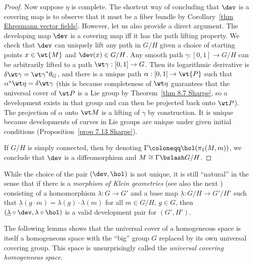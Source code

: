 \begin{proof}
    Now suppose $\eta$ is complete. The shortcut way of concluding that $\dev$ is a covering map is to observe that it must be a fiber bundle by Corollary~\ref{thm Ehresmann vector fields}. However, let us also provide a direct argument. The developing map $\dev$ is a covering map iff it has the path lifting property. We check that $\dev$ can uniquely lift any path in $G\slash H$ given a choice of starting points $x\in\wt{M}$ and $\dev(x)\in G\slash H$. Any smooth path $\gamma:[0,1]\to G\slash H$ can be arbitrarily lifted to a path $\wt\gamma:[0,1]\to G$. Then its logarithmic derivative is $\delta\wt\gamma={\wt\gamma}^\ast \theta_G$, and there is a unique path $\alpha:[0,1]\to \wt{P}$ such that $\alpha^\ast \wt\eta=\delta\wt\gamma$ (this is because completeness of $\wt\eta$ guarantees that the universal cover of $\wt P$ is a Lie group by Theorem~\ref{thm 8.7 Sharpe}, so a development exists in that group and can then be projected back onto $\wt P$). The projection of $\alpha$ onto $\wt M$ is a lifting of $\gamma$ by construction. It is unique because developments of curves in Lie groups are unique under given initial conditions (Proposition~\ref{prop 7.13 Sharpe}).

    If $G\slash H$ is simply connected, then by denoting $\Gamma\coloneqq \hol(\pi_1(M,m))$, we conclude that $\dev$ is a diffeomorphism and $M\cong \Gamma\bslash G\slash H$.
\end{proof}

\begin{xca}
    While the choice of the pair $(\dev,\hol)$ is not unique, it is still ``natural'' in the sense that if there is a \emph{morphism of Klein geometries} (see also the next \sect) consisting of a homomorphism $\lambda:G\to G'$ and a base map $\underline{\lambda}:G\slash H\to G'\slash H'$ such that $\underline{\lambda}(g\cdot m)=\lambda(g)\cdot \underline{\lambda}(m)$ for all $m\in G\slash H$, $g\in G$, then $(\underline{\lambda}\circ \dev,\lambda\circ \hol)$ is a valid development pair for $(G',H')$.
\end{xca}

The following lemma shows that the universal cover of a homogeneous space is itself a homogeneous space with the ``big'' group $G$ replaced by its own universal covering group. This space is unsurprisingly called the \emph{universal covering homogeneous space}.

